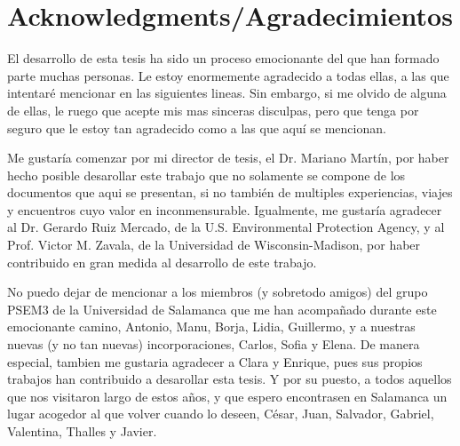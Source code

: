 



\bigskip

\begingroup
\let\clearpage\relax
\let\cleardoublepage\relax
\let\cleardoublepage\relax
\chapter*{Acknowledgments/Agradecimientos}
El desarrollo de esta tesis ha sido un proceso emocionante del que han formado parte muchas personas. Le estoy enormemente agradecido a todas ellas, a las que intentaré mencionar en las siguientes lineas. Sin embargo, si me olvido de alguna de ellas, le ruego que acepte mis mas sinceras disculpas, pero que tenga por seguro que le estoy tan agradecido como a las que aquí se mencionan.

Me gustaría comenzar por mi director de tesis, el Dr. Mariano Martín, por haber hecho posible desarollar este trabajo que no solamente se compone de los documentos que aqui se presentan, si no también de multiples experiencias, viajes y encuentros cuyo valor en inconmensurable. Igualmente, me gustaría agradecer al Dr. Gerardo Ruiz Mercado, de la U.S. Environmental Protection Agency, y al Prof. Victor M. Zavala, de la Universidad de Wisconsin-Madison, por haber contribuido en gran medida al desarrollo de este trabajo.

No puedo dejar de mencionar a los miembros (y sobretodo amigos) del grupo PSEM3 de la Universidad de Salamanca que me han acompañado durante este emocionante camino, Antonio, Manu, Borja, Lidia, Guillermo, y a nuestras nuevas (y no tan nuevas) incorporaciones, Carlos, Sofia y Elena. De manera especial, tambien me gustaria agradecer a Clara y Enrique, pues sus propios trabajos han contribuido a desarollar esta tesis. Y por su puesto, a todos aquellos que nos visitaron largo de estos años, y que espero encontrasen en Salamanca un lugar acogedor al que volver cuando lo deseen, César, Juan, Salvador, Gabriel, Valentina, Thalles y Javier.

